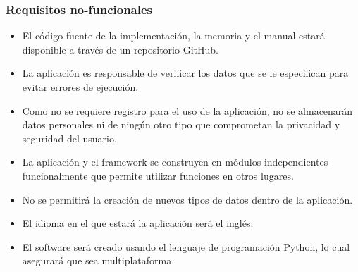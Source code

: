 \subsubsection{Requisitos no-funcionales}
\begin{itemize}
    \item El código fuente de la implementación, la memoria y el manual estará
    disponible a través de un repositorio GitHub.
    \item La aplicación es responsable de verificar los datos que se le especifican
    para evitar errores de ejecución.
    \item Como no se requiere registro para el uso de la aplicación, no se
    almacenarán datos personales ni de ningún otro tipo que comprometan la
    privacidad y seguridad del usuario.
    \item La aplicación y el framework se construyen en módulos independientes
    funcionalmente que permite utilizar funciones en otros lugares.
    \item No se permitirá la creación de nuevos tipos de datos dentro de la
    aplicación.
    \item El idioma en el que estará la aplicación será el inglés.
    \item El software será creado usando el lenguaje de programación Python, lo
    cual asegurará que sea multiplataforma.
\end{itemize}





